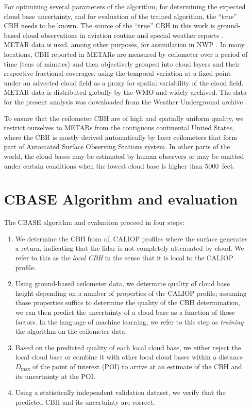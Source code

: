 \documentclass[essd,manuscript]{copernicus}\usepackage[]{graphicx}\usepackage[]{color}
\begin{document}
For optimizing several parameters of the algorithm, for determining the expected
cloud base uncertainty, and for evaluation of the trained algorithm, the
``true'' CBH needs to be known.  The source of the ``true'' CBH in this work is
ground-based cloud observations in aviation routine and special weather reports
\citep[][METARs and SPECIs, collectively referred to as METARs
henceforth]{metar}.  METAR data is used, among other purposes, for assimilation
in NWP \citep[][e.g.,]{HRRR, IFS}.  In many locations, CBH reported in METARs
are measured by ceilometer over a period of time (tens of minutes) and then
objectively grouped into cloud layers and their respective fractional coverages,
using the temporal variation at a fixed point under an advected cloud field as a
proxy for spatial variability of the cloud field.  METAR data is distributed
globally by the WMO and widely archived.  The data for the present analysis was
downloaded from the Weather Underground archive \citep{wunderground}.

To ensure that the ceilometer CBH are of high and spatially
uniform quality, we restrict ourselves to METARs from the contiguous continental
United States, where the CBH is mostly derived automatically by
laser ceilometers that form part of Automated Surface Observing Stations
\citep[][ASOS]{asos} system.  In other parts of the world, the cloud bases may
be estimated by human observers or may be omitted under certain conditions when
the lowest cloud base is higher than 5000~feet.  

\section{CBASE Algorithm and evaluation}
\label{sec:algorithm}

The CBASE algorithm and evaluation proceed in four steps:
\begin{enumerate}
\item We determine the CBH from all CALIOP profiles where the
  surface generates a return, indicating that the lidar is not completely
  attenuated by cloud.  We refer to this as the \textit{local
    CBH} in the sense that it is local to the CALIOP profile.
\item Using ground-based ceilometer data, we determine quality of cloud base
  height depending on a number of properties of the CALIOP profile; assuming
  those properties suffice to determine the quality of the CBH determination, we
  can then predict the uncertainty of a cloud base as a function of those
  factors.  In the language of machine learning, we refer to this step as
  \textit{training} the algorithm on the ceilometer data.
\item Based on the predicted quality of each local cloud base, we either reject
  the local cloud base or combine it with other local cloud bases within a
  distance $D_\text{max}$ of the point of interest (POI) to arrive at an 
  estimate of the CBH and its uncertainty at the POI.
\item Using a statistically independent validation dataset, we verify that the
  predicted CBH and its uncertainty are correct.
\end{enumerate}
\end{document}
